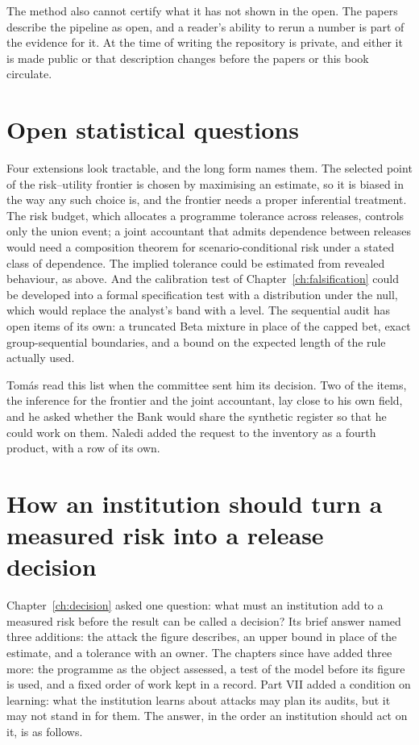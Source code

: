 The method also cannot certify what it has not shown in the open. The papers describe
the pipeline as open, and a reader's ability to rerun a number is part of the
evidence for it. At the time of writing the repository is private, and either it is
made public or that description changes before the papers or this book circulate.

\section{Open statistical questions}

Four extensions look tractable, and the long form names them. The selected point of
the risk--utility frontier is chosen by maximising an estimate, so it is biased in the
way any such choice is, and the frontier needs a proper inferential treatment. The
risk budget, which allocates a programme tolerance across releases, controls only the
union event; a joint accountant that admits dependence between releases would need a
composition theorem for scenario-conditional risk under a stated class of dependence.
The implied tolerance could be estimated from revealed behaviour, as above. And the
calibration test of Chapter~\ref{ch:falsification} could be developed into a formal
specification test with a distribution under the null, which would replace the
analyst's band with a level. The sequential audit has open items of its own: a
truncated Beta mixture in place of the capped bet, exact group-sequential boundaries,
and a bound on the expected length of the rule actually used.

Tom\'as read this list when the committee sent him its decision. Two of the items, the
inference for the frontier and the joint accountant, lay close to his own field, and he
asked whether the Bank would share the synthetic register so that he could work on them.
Naledi added the request to the inventory as a fourth product, with a row of its own.

\section{How an institution should turn a measured risk into a release decision}

Chapter~\ref{ch:decision} asked one question: what must an institution add to a measured
risk before the result can be called a decision? Its brief answer named three additions: the
attack the figure describes, an upper bound in place of the estimate, and a tolerance with an
owner. The chapters since have added three more: the programme as the object assessed, a test
of the model before its figure is used, and a fixed order of work kept in a record. Part VII
added a condition on learning: what the institution learns about attacks may plan its audits,
but it may not stand in for them. The answer, in the order an institution should act on it, is
as follows.


